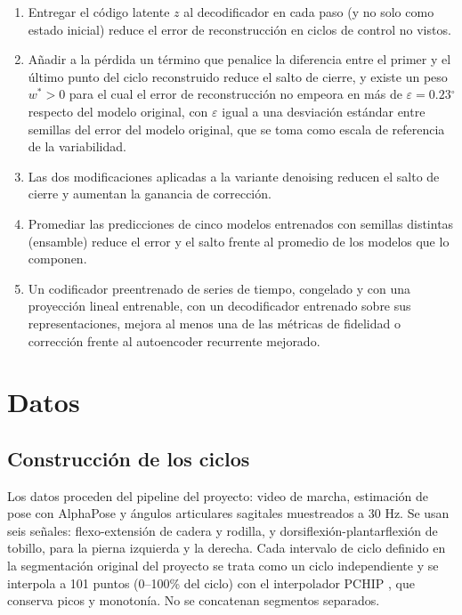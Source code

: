 \documentclass[11pt,a4paper]{article}
\newcommand{\gr}{$^{\circ}$}
\begin{document}
\begin{enumerate}[label=\textbf{H\arabic*.},leftmargin=2.2em]
\item Entregar el código latente $z$ al decodificador en cada paso (y no solo como estado inicial) reduce el error de reconstrucción en ciclos de control no vistos.
\item Añadir a la pérdida un término que penalice la diferencia entre el primer y el último punto del ciclo reconstruido reduce el salto de cierre, y existe un peso $w^\ast>0$ para el cual el error de reconstrucción no empeora en más de $\varepsilon=0.23$\gr{} respecto del modelo original, con $\varepsilon$ igual a una desviación estándar entre semillas del error del modelo original, que se toma como escala de referencia de la variabilidad.
\item Las dos modificaciones aplicadas a la variante denoising reducen el salto de cierre y aumentan la ganancia de corrección.
\item Promediar las predicciones de cinco modelos entrenados con semillas distintas (ensamble) reduce el error y el salto frente al promedio de los modelos que lo componen.
\item Un codificador preentrenado de series de tiempo, congelado y con una proyección lineal entrenable, con un decodificador entrenado sobre sus representaciones, mejora al menos una de las métricas de fidelidad o corrección frente al autoencoder recurrente mejorado.
\end{enumerate}

\section{Datos}

\subsection{Construcción de los ciclos}

Los datos proceden del pipeline del proyecto: video de marcha, estimación de pose con AlphaPose \cite{fang2023alphapose} y ángulos articulares sagitales muestreados a 30 Hz. Se usan seis señales: flexo-extensión de cadera y rodilla, y dorsiflexión-plantarflexión de tobillo, para la pierna izquierda y la derecha. Cada intervalo de ciclo definido en la segmentación original del proyecto se trata como un ciclo independiente y se interpola a 101 puntos (0--100\% del ciclo) con el interpolador PCHIP \cite{fritsch1980}, que conserva picos y monotonía. No se concatenan segmentos separados.
\end{document}
